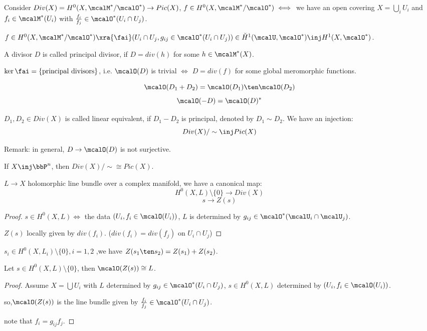 Consider $Div(X)=H^0(X,\mcalM^*/\mcalO^*)\to Pic(X)$,
$f\in H^0(X,\mcalM^*/\mcalO^*)\iff$ we have an open covering
$X=\bigcup_i U_i$ and $f_i\in\mcalM^*(U_i)$ with
$\frac{f_i}{f_j}\in\mcalO^*(U_i\cap U_j)$.

$f\in H^0(X,\mcalM^*/\mcalO^*)\xra{\fai}
(U_i\cap U_j,g_{ij}\in\mcalO^*(U_i\cap U_j))
\in \check{H}^1(\mcalU,\mcalO^*)\inj H^1(X,\mcalO^*)$.

\begin{definition}
A divisor $D$ is called principal divisor, if $D= div(h)$ for some 
$h\in\mcalM^*(X)$. 
\end{definition}

\begin{prop}
$\ker\fai=\{\text{principal divisors}\}$,
i.e. $\mcalO(D)$ is trivial $\iff$ $D= div(f)$ for some global meromorphic functions.
\end{prop}

\begin{prop}
$$\mcalO(D_1+D_2)=\mcalO(D_1)\ten\mcalO(D_2)$$
$$\mcalO(-D)=\mcalO(D)^*$$
\end{prop}

\begin{definition}
$D_1,D_2\in Div(X)$ is called linear equivalent, if $D_1-D_2$ is principal,
denoted by $D_1\sim D_2$. We have an injection:
$$Div(X)/\sim\inj Pic(X)$$
\end{definition}

Remark: in general, $D\to\mcalO(D)$ is not surjective.

If $X\inj\bbP^n$, then $Div(X)/\sim\cong Pic(X)$.

\begin{prop}
$L\to X$ holomorphic line bundle over a complex manifold,
we have a canonical map:
$$H^0(X,L)\setminus\{0\}\to Div(X)$$
$$s\to Z(s)$$
\end{prop}

\begin{proof}
$s\in H^0(X,L)\iff$ the data $(U_i,f_i\in\mcalO(U_i))$,
$L$ is determined by $g_{ij}\in\mcalO^*(\mcalU_i\cap\mcalU_j)$.

$Z(s)$ locally given by $div(f_i)$.
($div(f_i)=div(f_j)$ on $U_i\cap U_j$)
\end{proof}

\begin{prop}
$s_i\in H^0(X,L_i)\setminus\{0\}, i=1,2$ ,we have
$Z(s_1\ten s_2)=Z(s_1)+Z(s_2)$.
\end{prop}

\begin{prop}
Let $s\in H^0(X,L)\setminus\{0\}$, then $\mcalO(Z(s))\cong L$. 
\end{prop}
\begin{proof}
Assume $X=\bigcup U_i$ with $L$ determined by $g_{ij}\in\mcalO^*(U_i\cap U_j)$,
$s\in H^0(X,L)$ determined by $(U_i,f_i\in\mcalO(U_i))$.

so,$\mcalO(Z(s))$ is the line bundle given by $\frac{f_i}{f_j}\in\mcalO^*(U_i\cap U_j)$.

note that $f_i=g_{ij}f_j$.
\end{proof}

